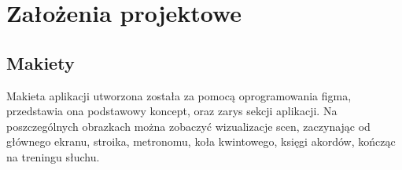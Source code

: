\chapter{Założenia projektowe}





\section{Makiety}
Makieta aplikacji utworzona została za pomocą oprogramowania figma, %
przedstawia ona podstawowy koncept, oraz zarys sekcji aplikacji. Na poszczególnych obrazkach można zobaczyć wizualizacje scen, zaczynając od głównego ekranu, stroika, metronomu, koła kwintowego, księgi akordów, kończąc na treningu słuchu. 

